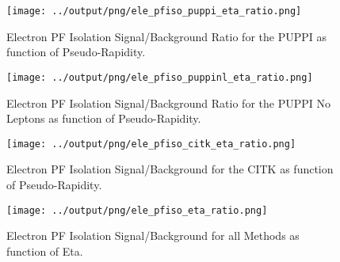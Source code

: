 \documentclass[11pt]{book}
\begin{document}
\begin{figure}[htb]
\centering
\texttt{[image: ../output/png/ele\_pfiso\_puppi\_eta\_ratio.png]}
\caption{Electron PF Isolation Signal/Background Ratio for the PUPPI as function of Pseudo-Rapidity.}
\label{fig:ele_pfiso_eta_ratio_puppi}
\end{figure}


\begin{figure}[htb]
\centering
\texttt{[image: ../output/png/ele\_pfiso\_puppinl\_eta\_ratio.png]}
\caption{Electron PF Isolation Signal/Background Ratio for the PUPPI No Leptons as function of Pseudo-Rapidity.}
\label{fig:ele_pfiso_eta_ratio_puppinl}
\end{figure}

\begin{figure}[htb]
\centering
\texttt{[image: ../output/png/ele\_pfiso\_citk\_eta\_ratio.png]}
\caption{Electron PF Isolation Signal/Background for the CITK as function of Pseudo-Rapidity.}
\label{fig:ele_pfiso_eta_ratio_citk}
\end{figure}

\begin{figure}[htb]
\centering
\texttt{[image: ../output/png/ele\_pfiso\_eta\_ratio.png]}
\caption{Electron PF Isolation Signal/Background for all Methods as function of Eta.}
\label{fig:ele_pfiso_eta_ratio}
\end{figure}
\clearpage
\end{document}
